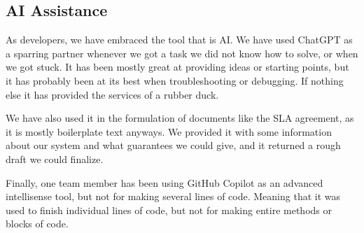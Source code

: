 

\subsection{AI Assistance}



As developers, we have embraced the tool that is AI. We have used ChatGPT as a sparring partner whenever we got a task we did not know how to solve, or when we got stuck. It has been mostly great at providing ideas or starting points, but it has probably been at its best when troubleshooting or debugging. If nothing else it has provided the services of a rubber duck.

We have also used it in the formulation of documents like the SLA agreement, as it is mostly boilerplate text anyways. We provided it with some information about our system and what guarantees we could give, and it returned a rough draft we could finalize.

Finally, one team member has been using GitHub Copilot as an advanced intellisense tool, but not for making several lines of code. Meaning that it was used to finish individual lines of code, but not for making entire methods or blocks of code.